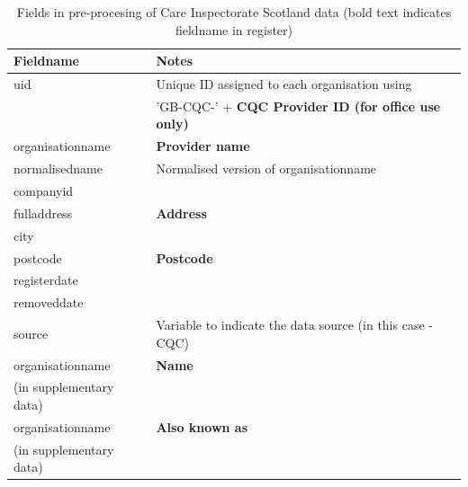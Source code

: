 \documentclass{article}
\begin{document}
\begin{table}[h]
  \centering
  \begin{tabularx}{\textwidth}{|l|X|}
    \hline
    Fieldname  &	Notes \\
    \hline \hline
uid & Unique ID assigned to each organisation using \\
&'GB-CQC-' + \textbf{CQC Provider ID (for office use only)}\\ \hline
organisationname & \textbf{Provider name} \\ \hline
normalisedname & Normalised version of organisationname\\ \hline
companyid &  \\ \hline
fulladdress &  \textbf{Address}\\ \hline
city & \\ \hline
postcode & \textbf{Postcode}\\ \hline
registerdate & \textbf{} \\ \hline
removeddate & \\ \hline
source & Variable to indicate the data source (in this case - CQC) \\ \hline
\hline \hline
organisationname & \textbf{Name} \\
(in supplementary data) & \\ \hline
organisationname & \textbf{Also known as} \\
(in supplementary data) & \\ \hline
\hline
\end{tabularx}
  \caption{Fields in pre-procesing of Care Inspectorate Scotland data (bold text indicates fieldname in register)}
  \label{tab:cqc_preprocess}

\end{table}
\end{document}
